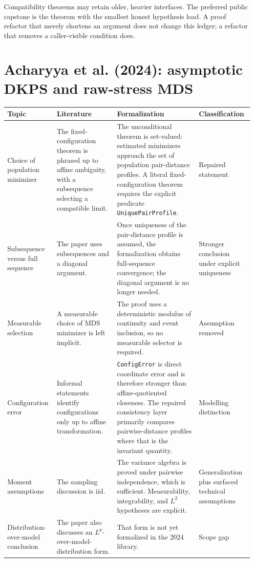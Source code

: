 \documentclass[11pt]{article}
\newcommand{\code}[1]{\texttt{#1}}
\begin{document}
Compatibility theorems may retain older, heavier interfaces.  The preferred
public capstone is the theorem with the smallest honest hypothesis load.  A
proof refactor that merely shortens an argument does not change this ledger; a
refactor that removes a caller-visible condition does.

\section{Acharyya et al. (2024): asymptotic DKPS and raw-stress MDS}

\begin{longtable}{>{\raggedright\arraybackslash}p{}
                  >{\raggedright\arraybackslash}p{}
                  >{\raggedright\arraybackslash}p{}
                  >{\raggedright\arraybackslash}p{}}
\toprule
Topic & Literature & Formalization & Classification \\
\midrule
\endhead
Choice of population minimizer & The fixed-configuration theorem is phrased
up to affine ambiguity, with a subsequence selecting a compatible limit. & The
unconditional theorem is set-valued: estimated minimizers approach the set of
population pair-distance profiles.  A literal fixed-configuration theorem
requires the explicit predicate \code{UniquePairProfile}. & Repaired statement
\\
\addlinespace
Subsequence versus full sequence & The paper uses subsequences and a diagonal
argument. & Once uniqueness of the pair-distance profile is assumed, the
formalization obtains full-sequence convergence; the diagonal argument is no
longer needed. & Stronger conclusion under explicit uniqueness \\
\addlinespace
Measurable selection & A measurable choice of MDS minimizer is left implicit. &
The proof uses a deterministic modulus of continuity and event inclusion, so no
measurable selector is required. & Assumption removed \\
\addlinespace
Configuration error & Informal statements identify configurations only up to
affine transformation. & \code{ConfigError} is direct coordinate error and is
therefore stronger than affine-quotiented closeness.  The repaired consistency
layer primarily compares pairwise-distance profiles where that is the invariant
quantity. & Modelling distinction \\
\addlinespace
Moment assumptions & The sampling discussion is iid. & The variance algebra is
proved under pairwise independence, which is sufficient.  Measurability,
integrability, and \(L^2\) hypotheses are explicit. & Generalization plus
surfaced technical assumptions \\
\addlinespace
Distribution-over-model conclusion & The paper also discusses an
\(L^p\)-over-model-distribution form. & That form is not yet formalized in the
2024 library. & Scope gap \\
\bottomrule
\end{longtable}
\end{document}
